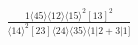 \documentclass[varwidth, border=5pt]{standalone}
\begin{document}
\begin{my}
$\begin{gathered}
\scriptscriptstyle\frac{1⟨45⟩⟨12⟩⟨15⟩^2[13]^2}{⟨14⟩^2[23]⟨24⟩⟨35⟩⟨1|2+3|1]}
\end{gathered}$
\end{my}
\end{document}

